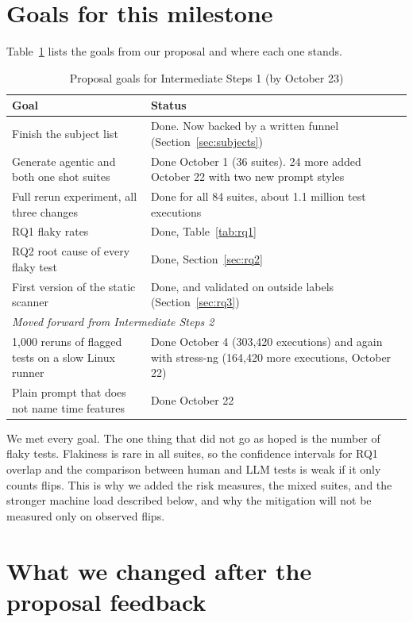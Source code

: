 \documentclass[sigconf,nonacm]{acmart}
\begin{document}
\section{Goals for this milestone}
Table~\ref{tab:goals} lists the goals from our proposal and where each one stands.

\begin{table}[h]
\caption{Proposal goals for Intermediate Steps 1 (by October 23)}
\label{tab:goals}
\small
\begin{tabular}{p{4.1cm}p{3.6cm}}
\toprule
Goal & Status \\
\midrule
Finish the subject list & Done. Now backed by a written funnel (Section~\ref{sec:subjects}) \\
Generate agentic and both one shot suites & Done October 1 (36 suites). 24 more added October 22 with two new prompt styles \\
Full rerun experiment, all three changes & Done for all 84 suites, about 1.1 million test executions \\
RQ1 flaky rates & Done, Table~\ref{tab:rq1} \\
RQ2 root cause of every flaky test & Done, Section~\ref{sec:rq2} \\
First version of the static scanner & Done, and validated on outside labels (Section~\ref{sec:rq3}) \\
\midrule
\multicolumn{2}{l}{\emph{Moved forward from Intermediate Steps 2}} \\
1,000 reruns of flagged tests on a slow Linux runner & Done October 4 (303,420 executions) and again with stress-ng (164,420 more executions, October 22) \\
Plain prompt that does not name time features & Done October 22 \\
\bottomrule
\end{tabular}
\end{table}

We met every goal. The one thing that did not go as hoped is the number of flaky tests. Flakiness is rare in all suites, so the confidence intervals for RQ1 overlap and the comparison between human and LLM tests is weak if it only counts flips. This is why we added the risk measures, the mixed suites, and the stronger machine load described below, and why the mitigation will not be measured only on observed flips.

\section{What we changed after the proposal feedback}
\label{sec:feedback}
\end{document}
